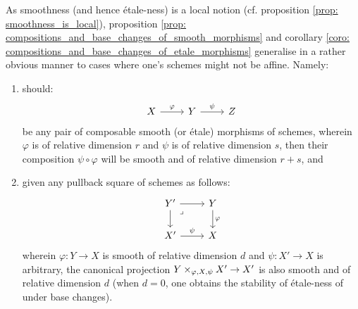                 \begin{remark}
                    As smoothness (and hence \'etale-ness) is a local notion (cf. proposition \ref{prop: smoothness_is_local}), proposition \ref{prop: compositions_and_base_changes_of_smooth_morphisms} and corollary \ref{coro: compositions_and_base_changes_of_etale_morphisms} generalise in a rather obvious manner to cases where one's schemes might not be affine. Namely:
                        \begin{enumerate}
                            \item should:
                                $$
                                    \begin{tikzcd}
                                        	X & Y & Z
                                        	\arrow["\varphi", from=1-1, to=1-2]
                                        	\arrow["\psi", from=1-2, to=1-3]
                                        \end{tikzcd}
                                $$
                            be any pair of composable smooth (or \'etale) morphisms of schemes, wherein $\varphi$ is of relative dimension $r$ and $\psi$ is of relative dimension $s$, then their composition $\psi \circ \varphi$ will be smooth and of relative dimension $r + s$, and
                            \item given any pullback square of schemes as follows:
                                $$
                                    \begin{tikzcd}
                                    	{Y'} & Y \\
                                    	{X'} & X
                                    	\arrow["\psi", from=2-1, to=2-2]
                                    	\arrow["\varphi", from=1-2, to=2-2]
                                    	\arrow[from=1-1, to=1-2]
                                    	\arrow[from=1-1, to=2-1]
                                    	\arrow["\lrcorner"{anchor=center, pos=0.125}, draw=none, from=1-1, to=2-2]
                                    \end{tikzcd}
                                $$
                            wherein $\varphi: Y \to X$ is smooth of relative dimension $d$ and $\psi: X' \to X$ is arbitrary, the canonical projection $Y \x_{\varphi, X, \psi} X' \to X'$ is also smooth and of relative dimension $d$ (when $d = 0$, one obtains the stability of \'etale-ness of under base changes).
                        \end{enumerate}
                \end{remark}
                
